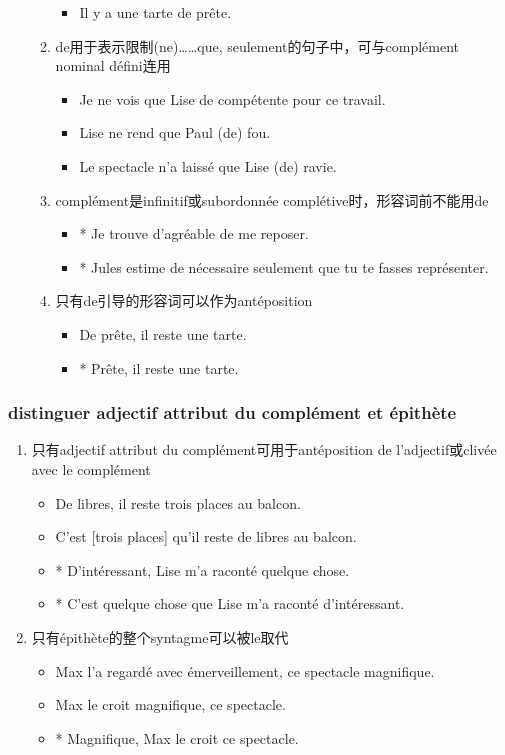 \documentclass[UTF8]{report}
\begin{document}
\begin{enumerate}
\begin{enumerate}
\begin{itemize}
            \item Il y a une tarte de prête.
        \end{itemize}
        \item de用于表示限制(ne)……que, seulement的句子中，可与complément nominal défini连用
        \begin{itemize}
            \item Je ne vois que Lise de compétente pour ce travail.
            \item Lise ne rend que Paul (de) fou.
            \item Le spectacle n’a laissé que Lise (de) ravie.
        \end{itemize}
        \item complément是infinitif或subordonnée complétive时，形容词前不能用de
        \begin{itemize}
            \item * Je trouve d’agréable de me reposer.
            \item * Jules estime de nécessaire seulement que tu te fasses représenter.
        \end{itemize}
        \item 只有de引导的形容词可以作为antéposition
        \begin{itemize}
            \item De prête, il reste une tarte.
            \item * Prête, il reste une tarte.
        \end{itemize}
    \end{enumerate}
\end{enumerate}

\subsubsection{distinguer adjectif attribut du complément et épithète}
\begin{enumerate}
    \item 只有adjectif attribut du complément可用于antéposition de l’adjectif或clivée avec le complément
    \begin{itemize}
        \item De libres, il reste trois places au balcon.
        \item C’est [trois places] qu’il reste de libres au balcon.
        \item * D’intéressant, Lise m’a raconté quelque chose.
        \item * C’est quelque chose que Lise m’a raconté d’intéressant.
    \end{itemize}
    \item 只有épithète的整个syntagme可以被le取代
        \begin{itemize}
            \item Max l’a regardé avec émerveillement, ce spectacle magnifique.
            \item Max le croit magnifique, ce spectacle.
            \item * Magnifique, Max le croit ce spectacle.
        \end{itemize}
\end{enumerate}
\end{document}
